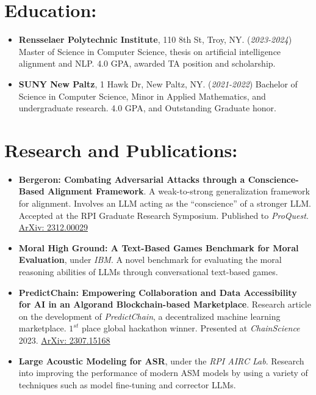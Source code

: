 \documentclass[12pt]{article}
\begin{document}
\section*{Education:}
\begin{itemize}
    \itemsep0em
    \item \textbf{Rensselaer Polytechnic Institute}, 110 8th St, Troy, NY. (\textit{2023-2024}) Master of Science in Computer Science, thesis on artificial intelligence alignment and NLP.  4.0 GPA, awarded TA position and scholarship.
    \item \textbf{SUNY New Paltz}, 1 Hawk Dr, New Paltz, NY. (\textit{2021-2022}) Bachelor of Science in Computer Science, Minor in Applied Mathematics, and undergraduate research. 4.0 GPA, and Outstanding Graduate honor.
\end{itemize}

\section*{Research and Publications:}
\begin{itemize}
    \itemsep0em
    
    \item \textbf{Bergeron: Combating Adversarial Attacks through a Conscience-Based Alignment Framework}.  A weak-to-strong generalization framework for alignment.  Involves an LLM acting as the ``conscience'' of a stronger LLM.  Accepted at the RPI Graduate Research Symposium.  Published to \textit{ProQuest}.  \href{https://arxiv.org/abs/2312.00029}{ArXiv: 2312.00029}
    
    \item \textbf{Moral High Ground: A Text-Based Games Benchmark for Moral Evaluation}, under \textit{IBM}.  A novel benchmark for evaluating the moral reasoning abilities of LLMs through conversational text-based games.
    
    \item \textbf{PredictChain: Empowering Collaboration and Data Accessibility for AI in an Algorand Blockchain-based Marketplace}.  Research article on the development of \textit{PredictChain}, a decentralized machine learning marketplace.  $1^{st}$ place global hackathon winner.  Presented at \textit{ChainScience} 2023. \href{https://arxiv.org/abs/2307.15168}{ArXiv: 2307.15168}
    
    \item \textbf{Large Acoustic Modeling for ASR}, under the \textit{RPI AIRC Lab}. Research into improving the performance of modern ASM models by using a variety of techniques such as model fine-tuning and corrector LLMs.
    
\end{itemize}
\end{document}
